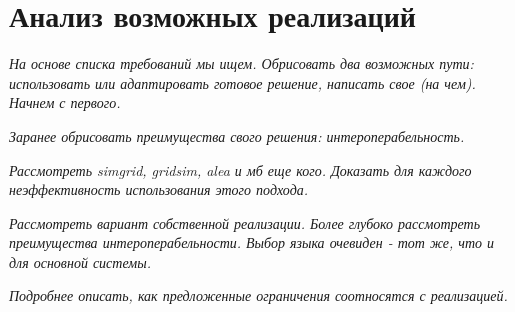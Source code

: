 \chapter{Анализ возможных реализаций}

\textit{На основе списка требований мы ищем. Обрисовать два возможных пути: использовать или адаптировать готовое решение, написать свое (на чем). Начнем с первого.}

\textit{Заранее обрисовать преимущества свого решения: интероперабельность.}

\textit{Рассмотреть simgrid, gridsim, alea и мб еще кого. Доказать для каждого неэффективность использования этого подхода.}

\textit{Рассмотреть вариант собственной реализации. Более глубоко рассмотреть преимущества интероперабельности. Выбор языка очевиден - тот же, что и для основной системы.}

\textit{Подробнее описать, как предложенные ограничения соотносятся с реализацией.}